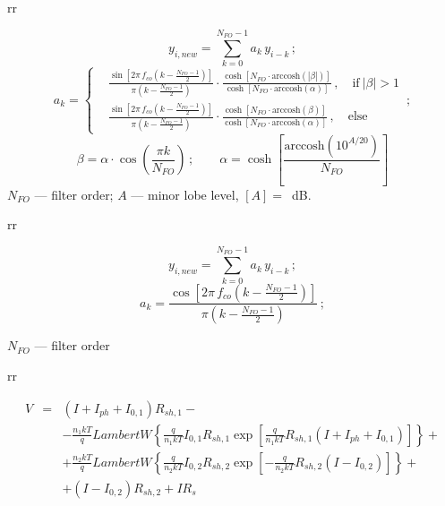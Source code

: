 \documentclass[14pt]{article}
\numberwithin{equation}{part}
\begin{document}
rr

\begin{equation*}
    y_{i,new} = \sum_{k=0}^{N_{FO}-1}a_k\,y_{i-k}\,;
\end{equation*}
\begin{equation*}
    a_k=
   \left\{
   \begin{aligned}
   &\frac{\sin\left[2\pi\,f_{co}\left(k-\frac{N_{FO}-1}{2}\right)\right]}{\pi\left(k-\frac{N_{FO}-1}{2}\right)}
    \cdot\frac{\cosh\left[N_{FO}\cdot\text{arccosh}\left(|\beta|\right)\right]}
              {\cosh\left[N_{FO}\cdot\text{arccosh}\left(\alpha\right)\right]}\,,
              \quad\text{if}\: |\beta|>1 \\
   &\frac{\sin\left[2\pi\,f_{co}\left(k-\frac{N_{FO}-1}{2}\right)\right]}{\pi\left(k-\frac{N_{FO}-1}{2}\right)}
    \cdot\frac{\cosh\left[N_{FO}\cdot\text{arccosh}\left(\beta\right)\right]}
              {\cosh\left[N_{FO}\cdot\text{arccosh}\left(\alpha\right)\right]}\,,
               \quad\text{else}
    \end{aligned}
     \right.\,;
\end{equation*}
\begin{equation*}
    \beta = \alpha\cdot\cos\left(\frac{\pi k}{N_{FO}}\right)\,;
    \qquad \alpha=\cosh\left[\frac{\text{arccosh}\left(10^{A/20}\right)}{N_{FO}}\right]
\end{equation*}
\hspace{1cm}
 $N_{FO}$ --- filter order;
 $A$ --- minor lobe level, $[A]=$~dB.

 rr

\begin{equation*}
    y_{i,new} = \sum_{k=0}^{N_{FO}-1}a_k\,y_{i-k}\,;
\end{equation*}
\begin{equation*}
    a_k=\frac{\cos\left[2\pi\,f_{co}\left(k-\frac{N_{FO}-1}{2}\right)\right]}{\pi\left(k-\frac{N_{FO}-1}{2}\right)}\,;
\end{equation*}

\hspace{5cm} $N_{FO}$ --- filter order

rr

\begin{eqnarray*}
  V&=&(I+I_{ph}+I_{0,1})R_{sh,1}-\\
  &&-\frac{n_1kT}{q}LambertW\left\{\frac{q}{n_1kT}I_{0,1}R_{sh,1}
  \exp\left[\frac{q}{n_1kT}R_{sh,1}\left(I+I_{ph}+I_{0,1}\right)\right]\right\}+\\
  &&+\frac{n_2kT}{q}LambertW\left\{\frac{q}{n_2kT}I_{0,2}R_{sh,2}
  \exp\left[-\frac{q}{n_2kT}R_{sh,2}\left(I-I_{0,2}\right)\right]\right\}+\\
  &&+\left(I-I_{0,2}\right)R_{sh,2}+IR_s
\end{eqnarray*}
\end{document}
